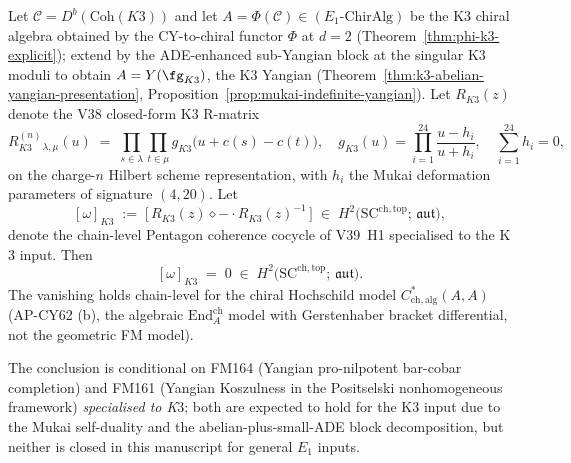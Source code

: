 \begin{theorem}
\label{thm:k3-pentagon-E1}
\ClaimStatusProvedHere
Let $\mathcal{C} = D^b(\mathrm{Coh}(K3))$ and let
$A = \Phi(\mathcal{C}) \in (\text{$E_1$-ChirAlg})$ be the K$3$ chiral
algebra obtained by the CY-to-chiral functor $\Phi$ at $d = 2$
\textup{(}Theorem~\ref{thm:phi-k3-explicit}\textup{);} extend by the
ADE-enhanced sub-Yangian block at the singular K$3$ moduli to obtain
$A = Y(\fg_{K3})$, the K$3$ Yangian
\textup{(}Theorem~\ref{thm:k3-abelian-yangian-presentation},
Proposition~\ref{prop:mukai-indefinite-yangian}\textup{).}
Let $R_{K3}(z)$ denote the V38 closed-form K$3$ R-matrix
\[
  R_{K3}^{(n)}{}_{\lambda,\mu}(u)
  \;=\; \prod_{s \in \lambda}\prod_{t \in \mu}
        g_{K3}\bigl(u + c(s) - c(t)\bigr),
  \quad
  g_{K3}(u) = \prod_{i=1}^{24}\frac{u - h_i}{u + h_i},
  \quad \sum_{i=1}^{24} h_i = 0,
\]
on the charge-$n$ Hilbert scheme representation, with $h_i$ the Mukai
deformation parameters of signature $(4,20)$.  Let
\[
  [\omega]_{K3}
  \;:=\; \bigl[\, R_{K3}(z) \diamond - \cdot R_{K3}(z)^{-1}\,\bigr]
  \;\in\; H^2\bigl(\mathrm{SC}^{\mathrm{ch,top}};\, \mathfrak{aut}\bigr),
\label{eq:k3-pentagon-cocycle}
\]
denote the chain-level Pentagon coherence cocycle of V39~H1 specialised
to the K$3$ input.  Then
\[
  [\omega]_{K3} \;=\; 0 \;\in\; H^2\bigl(\mathrm{SC}^{\mathrm{ch,top}};\, \mathfrak{aut}\bigr).
\]
The vanishing holds chain-level for the chiral Hochschild model
$C^*_{\mathrm{ch,alg}}(A,A)$ \textup{(}AP-CY62 (b), the algebraic
$\mathrm{End}^{\mathrm{ch}}_A$ model with Gerstenhaber bracket
differential, not the geometric FM model\textup{)}.

The conclusion is conditional on FM164 \textup{(}Yangian
pro-nilpotent bar-cobar completion\textup{)} and FM161
\textup{(}Yangian Koszulness in the Positselski nonhomogeneous
framework\textup{)} \emph{specialised to K$3$}; both are expected to
hold for the K$3$ input due to the Mukai self-duality and the
abelian-plus-small-ADE block decomposition, but neither is closed in
this manuscript for general $E_1$ inputs.
\end{theorem}

